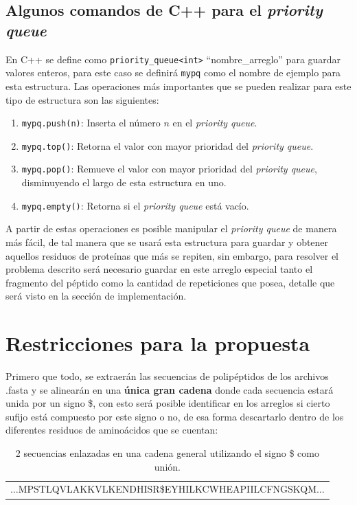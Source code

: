 \subsection{Algunos comandos de C++ para el \textit{priority queue}}

En C++ se define como \texttt{priority\_queue<int>} ``nombre\_arreglo'' para guardar valores enteros, para este caso se definirá \texttt{mypq} como el nombre de ejemplo para esta estructura. Las operaciones más importantes que se pueden realizar para este tipo de estructura son las siguientes:

\begin{enumerate}

\item \texttt{mypq.push(n)}: Inserta el número $n$ en el \textit{priority queue}.
\item \texttt{mypq.top()}: Retorna el valor con mayor prioridad del \textit{priority queue}.
\item \texttt{mypq.pop()}: Remueve el valor con mayor prioridad del \textit{priority queue}, disminuyendo el largo de esta estructura en uno.
\item \texttt{mypq.empty()}: Retorna si el \textit{priority queue} está vacío.

\end{enumerate}

A partir de estas operaciones es posible manipular el \textit{priority queue} de manera más fácil, de tal manera que se usará esta estructura para guardar y obtener aquellos residuos de proteínas que más se repiten, sin embargo, para resolver el problema descrito será necesario guardar en este arreglo especial tanto el fragmento del péptido como la cantidad de repeticiones que posea, detalle que será visto en la sección de implementación.

\section{Restricciones para la propuesta}

Primero que todo, se extraerán las secuencias de polipéptidos de los archivos .fasta y se alinearán en una \textbf{única gran cadena} donde cada secuencia estará unida por un signo \$, con esto será posible identificar en los arreglos si cierto sufijo está compuesto por este signo o no, de esa forma descartarlo dentro de los diferentes residuos de aminoácidos que se cuentan:

\begin{table}[h]
\centering
\label{propuesta-22}
\begin{tabular}{c}
$\ldots$MPSTLQVLAKKVLKENDHISR\$EYHILKCWHEAPIILCFNGSKQM$\ldots$\\ 
\end{tabular}
\caption{2 secuencias enlazadas en una cadena general utilizando el signo \$ como unión.}
\end{table}

